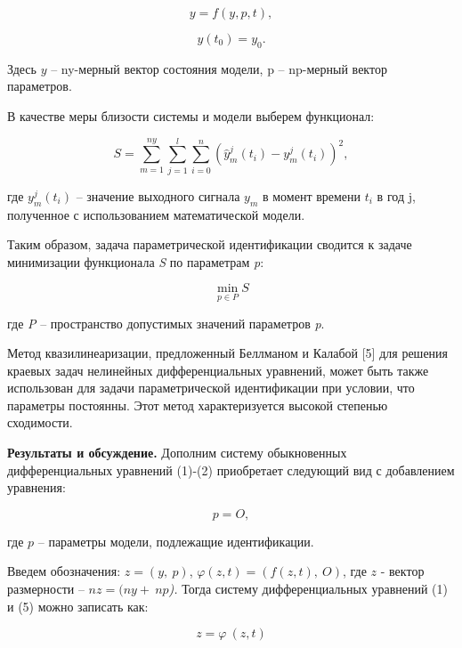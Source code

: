 \begin{multicols}{2}
\begin{equation}
y = f(y,p,t),
\end{equation}

\begin{equation}
y\left( t_{0} \right) = y_{0}.
\end{equation}

Здесь \(y\) -- ny-мерный вектор состояния модели, p -- np-мерный вектор
параметров.

В качестве меры близости системы и модели выберем функционал:

\begin{equation}
S = \sum_{m = 1}^{ny}{\sum_{j = 1}^{l}{\sum_{i = 0}^{n}{({\widehat{y}}_{m}^{j}\left( t_{i} \right) - y_{m}^{j}\left( t_{i} \right))}^{2}}},
\end{equation}

где \(y_{m}^{j}(t_{i})\) -- значение
выходного сигнала \(y_{m}\) в момент времени \(t_{i}\) в год j,
полученное с использованием математической модели.

Таким образом, задача параметрической идентификации сводится к задаче
минимизации функционала \emph{S} по параметрам \emph{p}:

\begin{equation}
\min_{p \in P}S
\end{equation}

где \emph{P} -- пространство допустимых значений параметров \emph{p}.

Метод квазилинеаризации, предложенный Беллманом и Калабой {[}5{]} для
решения краевых задач нелинейных дифференциальных уравнений, может быть
также использован для задачи параметрической идентификации при условии,
что параметры постоянны. Этот метод характеризуется высокой степенью
сходимости.

{\bfseries Результаты и обсуждение.} Дополним систему обыкновенных
дифференциальных уравнений (1)-(2) приобретает следующий вид с
добавлением уравнения:

\begin{equation}
p = O,
\end{equation}

где \(p\) -- параметры модели, подлежащие идентификации.

Введем обозначения: \(z = (y,\ p)\),
\(\varphi(z,t) = \left( f(z,t),\ O \right)\), где \(z\) - вектор
размерности -- \(nz = (ny + \ np\)\emph{).} Тогда систему
дифференциальных уравнений (1) и (5) можно записать как:

\begin{equation}
z = \varphi\ (z,t)
\end{equation}


\end{multicols}
